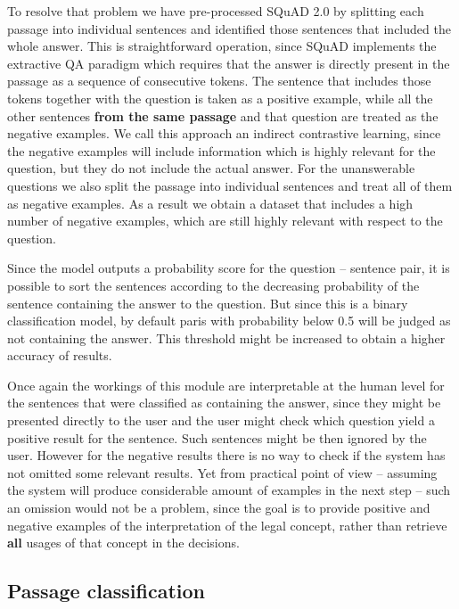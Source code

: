 To resolve that problem we have pre-processed SQuAD 2.0 by splitting each passage into individual sentences and identified
those sentences that included the whole answer. This is straightforward operation, since SQuAD implements the extractive
QA paradigm which requires that the answer is directly present in the passage as a sequence of consecutive tokens.
The sentence that includes those tokens together with the question is taken as a positive example, while
all the other sentences \textbf{from the same passage} and that question are treated as the negative examples.
We call this approach an indirect contrastive learning, since the negative examples will include information 
which is highly relevant for the question, but they do not include the actual answer. For the unanswerable questions
we also split the passage into individual sentences and treat all of them as negative examples. As a result we 
obtain a dataset that includes a high number of negative examples, which are still highly relevant with respect to the 
question.

Since the model outputs a probability score for the question -- sentence pair, it is possible to sort the sentences according
to the decreasing probability of the sentence containing the answer to the question. But since this is a binary classification
model, by default paris with probability below 0.5 will be judged as not containing the answer. This threshold might be increased
to obtain a higher accuracy of results. 

Once again the workings of this module are interpretable at the human level for the sentences that were classified as 
containing the answer, since they might be presented directly to the user and the user might check which question
yield a positive result for the sentence. Such sentences might be then ignored by the user. However for the negative 
results there is no way to check if the system has not omitted some relevant results. Yet from practical point of view
-- assuming the system will produce considerable amount of examples in the next step -- such an 
omission would not be a problem, since the goal is to provide positive and negative examples of the interpretation of the
legal concept, rather than retrieve \textbf{all} usages of that concept in the decisions.

\subsection{Passage classification}


